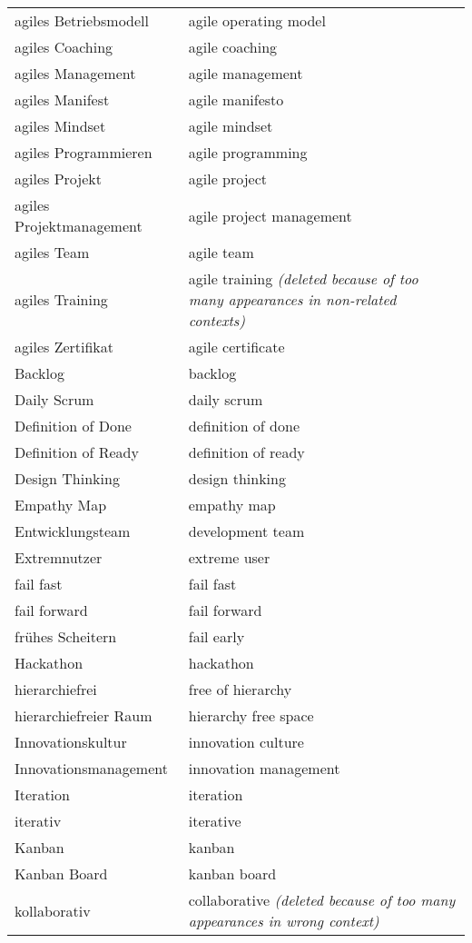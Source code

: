 \begin{spacing}{.5}
\begin{longtable}{ p{} p{}}
    agiles Betriebsmodell & agile operating model \\
    agiles Coaching & agile coaching \\
    agiles Management & agile management \\
    agiles Manifest & agile manifesto \\
    agiles Mindset & agile mindset \\
    agiles Programmieren & agile programming \\
    agiles Projekt & agile project \\
    agiles Projektmanagement & agile project management \\
    agiles Team & agile team \\
    agiles Training & agile training \textit{(deleted because of too many appearances in non-related contexts)} \\
    agiles Zertifikat & agile certificate \\
    Backlog & backlog \\
    Daily Scrum & daily scrum \\
    Definition of Done & definition of done \\
    Definition of Ready & definition of ready \\
    Design Thinking & design thinking \\
    Empathy Map & empathy map \\
    Entwicklungsteam & development team \\
    Extremnutzer & extreme user \\
    fail fast & fail fast \\
    fail forward & fail forward \\
    frühes Scheitern & fail early\\
    Hackathon & hackathon \\
    hierarchiefrei & free of hierarchy \\
    hierarchiefreier Raum & hierarchy free space \\
    Innovationskultur & innovation culture \\
    Innovationsmanagement & innovation management \\
    Iteration & iteration \\
    iterativ & iterative \\
    Kanban & kanban \\
    Kanban Board & kanban board \\
    kollaborativ & collaborative \textit{(deleted because of too many appearances in wrong context)} \\

\end{longtable}
\end{spacing}
